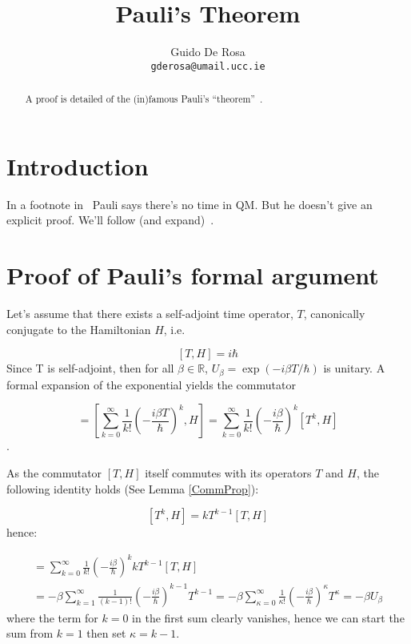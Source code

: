 \documentclass[a4paper,12pt]{article}
\author{Guido De Rosa \\ \small\tt{gderosa@umail.ucc.ie}}
\title{Pauli's Theorem}
\begin{document}
\maketitle

\begin{abstract}
A proof is detailed of the (in)famous Pauli's ``theorem''~\cite[footnote~2]{PauliFootnote}.
\end{abstract}

\section{Introduction}

In a footnote in~\cite{PauliFootnote} Pauli says there's no time in QM. But he
doesn't give an explicit proof. We'll follow (and expand)~\cite{Galapon2002}.

\section{Proof of Pauli's formal argument}\label{proof}

Let's assume that there exists a self-adjoint time operator, $T$, canonically conjugate
to the Hamiltonian $H$, i.e.

\begin{equation}
\label{THcommutator}
[T, H] = i\hbar
\end{equation}
Since T is self-adjoint, then for all
$\beta\in\mathbb{R}$, $U_{\beta} = \exp(- i \beta T / \hbar)$
is unitary. A formal
expansion of the exponential yields the commutator

\begin{equation}
[U_{\beta}, H]  = 
\left[
    \sum_{k=0}^{\infty} \frac{1}{k!} \left(- \frac{i\beta T}{\hbar} \right)^k, H
\right]         =
\sum_{k=0}^{\infty} \frac{1}{k!} \left(- \frac{i\beta}{\hbar} \right)^k [T^k, H]
\end{equation}.

As the commutator $[T, H]$ itself commutes with its operators $T$ and $H$,
the following identity holds (See Lemma \ref{CommProp}):

$$
[T^k, H] = kT^{k-1}[T, H]
$$
hence:

\begin{multline}
[U_{\beta}, H]  = 
\sum_{k=0}^{\infty} \frac{1}{k!} \left(- \frac{i\beta}{\hbar} \right)^k kT^{k-1}[T, H] \\ =
-\beta\sum_{k=1}^{\infty} \frac{1}{(k-1)!} \left(- \frac{i\beta}{\hbar} \right)^{k-1} T^{k-1} =
-\beta\sum_{\kappa=0}^{\infty} \frac{1}{\kappa!} \left(- \frac{i\beta}{\hbar} \right)^{\kappa} T^{\kappa} =
-\beta U_{\beta}
\end{multline}
where the term for $k=0$ in the first sum clearly vanishes, hence we can start the sum from 
$k=1$ then set $\kappa=k-1$.
\end{document}
